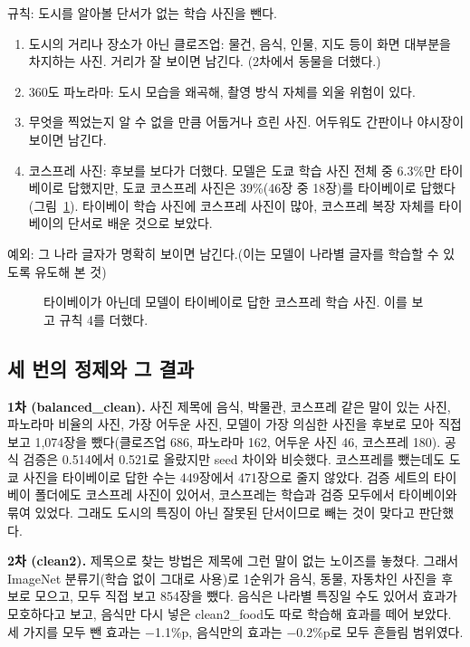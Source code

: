 \documentclass[11pt]{article}
\begin{document}
규칙: 도시를 알아볼 단서가 없는 학습 사진을 뺀다.
\begin{enumerate}
\item 도시의 거리나 장소가 아닌 클로즈업: 물건, 음식, 인물, 지도 등이 화면 대부분을 차지하는 사진. 거리가 잘 보이면 남긴다. (2차에서 동물을 더했다.)
\item 360도 파노라마: 도시 모습을 왜곡해, 촬영 방식 자체를 외울 위험이 있다.
\item 무엇을 찍었는지 알 수 없을 만큼 어둡거나 흐린 사진. 어두워도 간판이나 야시장이 보이면 남긴다.
\item 코스프레 사진: 후보를 보다가 더했다. 모델은 도쿄 학습 사진 전체 중 6.3\%만 타이베이로 답했지만, 도쿄 코스프레 사진은 39\%(46장 중 18장)를 타이베이로 답했다(그림~\ref{fig:cosplay}). 타이베이 학습 사진에 코스프레 사진이 많아, 코스프레 복장 자체를 타이베이의 단서로 배운 것으로 보았다.
\end{enumerate}
예외: 그 나라 글자가 명확히 보이면 남긴다.(이는 모델이 나라별 글자를 학습할 수 있도록 유도해 본 것)

\begin{figure}[H]\centering
{}
\caption{타이베이가 아닌데 모델이 타이베이로 답한 코스프레 학습 사진. 이를 보고 규칙 4를 더했다.}
\label{fig:cosplay}
\end{figure}

\subsection*{세 번의 정제와 그 결과}

\textbf{1차 (balanced\_clean).} 사진 제목에 음식, 박물관, 코스프레 같은 말이 있는 사진, 파노라마 비율의 사진, 가장 어두운 사진, 모델이 가장 의심한 사진을 후보로 모아 직접 보고 1,074장을 뺐다(클로즈업 686, 파노라마 162, 어두운 사진 46, 코스프레 180). 공식 검증은 0.514에서 0.521로 올랐지만 seed 차이와 비슷했다. 코스프레를 뺐는데도 도쿄 사진을 타이베이로 답한 수는 449장에서 471장으로 줄지 않았다. 검증 세트의 타이베이 폴더에도 코스프레 사진이 있어서, 코스프레는 학습과 검증 모두에서 타이베이와 묶여 있었다. 그래도 도시의 특징이 아닌 잘못된 단서이므로 빼는 것이 맞다고 판단했다.

\textbf{2차 (clean2).} 제목으로 찾는 방법은 제목에 그런 말이 없는 노이즈를 놓쳤다. 그래서 ImageNet 분류기(학습 없이 그대로 사용)로 1순위가 음식, 동물, 자동차인 사진을 후보로 모으고, 모두 직접 보고 854장을 뺐다. 음식은 나라별 특징일 수도 있어서 효과가 모호하다고 보고, 음식만 다시 넣은 clean2\_food도 따로 학습해 효과를 떼어 보았다. 세 가지를 모두 뺀 효과는 −1.1\%p, 음식만의 효과는 −0.2\%p로 모두 흔들림 범위였다.
\end{document}
